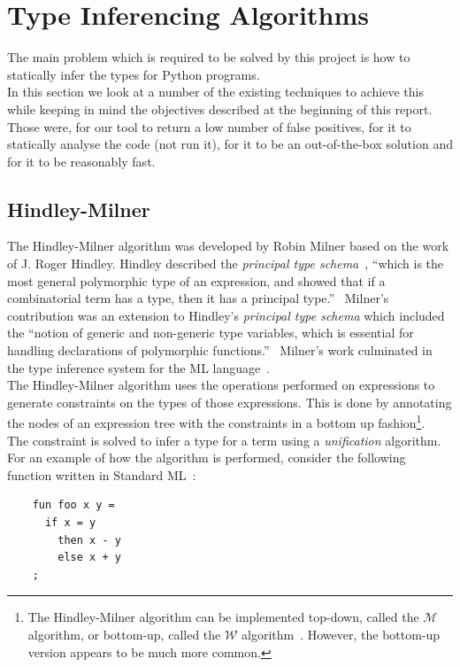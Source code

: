 \documentclass[12pt, titlepage]{article}
\begin{document}
\newpage
\section{Type Inferencing Algorithms}
The main problem which is required to be solved by this project is how to statically infer the types for Python programs. \\
\indent In this section we look at a number of the existing techniques to achieve this while keeping in mind the objectives described at the beginning of this report. Those were, for our tool to return a low number of false positives, for it to statically analyse the code (not run it), for it to be an out-of-the-box solution and for it to be reasonably fast.

\subsection{Hindley-Milner}
The Hindley-Milner algorithm was developed by Robin Milner based on the work of J. Roger Hindley. Hindley described the \textit{principal
type schema}~\cite{hindley69}, ``which is the most general polymorphic type of an expression, and showed that if a combinatorial term has a type, then it has a principal type.''~\cite{cardelli87} Milner's contribution was an extension to Hindley's \textit{principal type schema} which included the ``notion of generic and non-generic type variables, which is essential for handling declarations of polymorphic functions.''~\cite{cardelli87} Milner's work culminated in the type inference system for the ML language~\cite{milner84}. \\
\indent The Hindley-Milner algorithm uses the operations performed on expressions to generate constraints on the types of those expressions. This is done by annotating the nodes of an expression tree with the constraints in a bottom up fashion\footnote{The Hindley-Milner algorithm can be implemented top-down, called the $\mathcal{M}$ algorithm, or bottom-up, called the $\mathcal{W}$ algorithm~\cite{heeren02}. However, the bottom-up version appears to be much more common.}. \\ 
\indent The constraint is solved to infer a type for a term using a \textit{unification} algorithm. \\
\indent For an example of how the algorithm is performed, consider the following function written in Standard ML~\cite{cannonlocalizedtype}:
\begin{lstlisting}
    fun foo x y =
      if x = y
        then x - y
        else x + y
    ;
\end{lstlisting}
\end{document}
